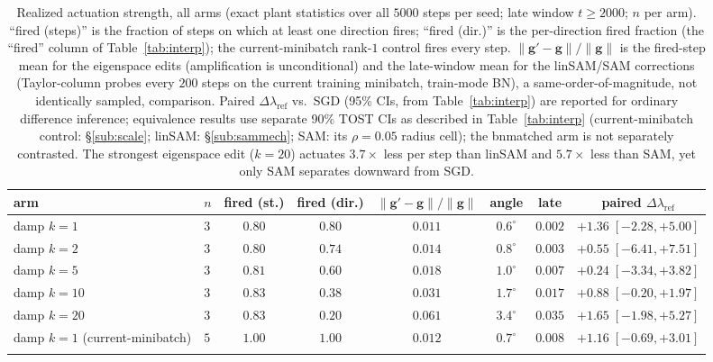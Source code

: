\documentclass{article}
\theoremstyle{plain}
\theoremstyle{definition}
\theoremstyle{remark}
\newcommand{\lref}{\ensuremath{\lambda_{\mathrm{ref}}}}
\newcommand{\RTableTopGap}{%
  \setlength{\abovetopsep}{2pt}%
}
\newcommand{\RTableDenseRules}{%
  \setlength{\aboverulesep}{.55ex}%
  \setlength{\belowrulesep}{.75ex}%
}
\begin{document}
\begin{table}[!ht]
\centering\footnotesize
\setlength{\tabcolsep}{2pt}
\caption{Realized actuation strength, all arms (exact plant statistics
over all $5000$ steps per seed; late window $t\ge2000$; $n$ per arm).
``fired (steps)'' is the fraction of steps on which at least one
direction fires; ``fired (dir.)'' is the per-direction fired fraction
(the ``fired'' column of Table~\ref{tab:interp}); the current-minibatch
rank-$1$ control fires every step. $\|\mathbf{g}'-\mathbf{g}\|/\|\mathbf{g}\|$
is the fired-step mean for the eigenspace edits (amplification is
unconditional) and the late-window mean for the linSAM/SAM corrections
(Taylor-column probes every $200$ steps on the current training
minibatch, train-mode BN), a same-order-of-magnitude, not identically
sampled, comparison. Paired $\Delta\lref$ vs.\ SGD (95\% CIs, from
Table~\ref{tab:interp}) are reported for ordinary difference
inference; equivalence results use separate 90\% TOST CIs as described
in Table~\ref{tab:interp} (current-minibatch control: \S\ref{sub:scale};
linSAM: \S\ref{sub:sammech}; SAM: its $\rho{=}0.05$ radius cell); the
bnmatched arm is not separately contrasted. The strongest eigenspace
edit ($k{=}20$) actuates $3.7\times$ less per step than linSAM and
$5.7\times$ less than SAM, yet only SAM separates downward from SGD.}
\label{tab:actuationfull}
{\renewcommand{\arraystretch}{1.14}\RTableTopGap\RTableDenseRules
\begin{tabular}{llcccccc}
\toprule
arm & $n$ & fired (st.) & fired (dir.) &
$\|\mathbf{g}'-\mathbf{g}\|/\|\mathbf{g}\|$ & angle & late &
paired $\Delta\lref$ \\
\midrule
damp $k{=}1$  & $3$ & $0.80$ & $0.80$ & $0.011$ & $0.6^{\circ}$ & $0.002$ & $+1.36\;[-2.28,+5.00]$ \\
damp $k{=}2$  & $3$ & $0.80$ & $0.74$ & $0.014$ & $0.8^{\circ}$ & $0.003$ & $+0.55\;[-6.41,+7.51]$ \\
damp $k{=}5$  & $3$ & $0.81$ & $0.60$ & $0.018$ & $1.0^{\circ}$ & $0.007$ & $+0.24\;[-3.34,+3.82]$ \\
damp $k{=}10$ & $3$ & $0.83$ & $0.38$ & $0.031$ & $1.7^{\circ}$ & $0.017$ & $+0.88\;[-0.20,+1.97]$ \\
damp $k{=}20$ & $3$ & $0.83$ & $0.20$ & $0.061$ & $3.4^{\circ}$ & $0.035$ & $+1.65\;[-1.98,+5.27]$ \\
\addlinespace[1.5pt]
damp $k{=}1$ (current-minibatch) & $5$ & $1.00$ & $1.00$ & $0.012$ & $0.7^{\circ}$ & $0.008$ & $+1.16\;[-0.69,+3.01]$ \\
\addlinespace[1.5pt]

\end{tabular}}
\end{table}
\end{document}
